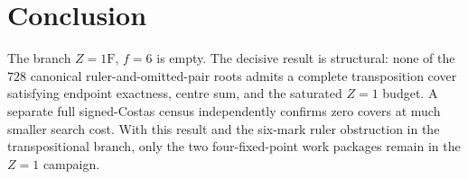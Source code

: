 \documentclass[11pt,a4paper]{article}
\begin{document}
\section{Conclusion}
The branch $Z=1\mathrm F$, $f=6$ is empty. The decisive result is structural: none of the $728$ canonical ruler-and-omitted-pair roots admits a complete transposition cover satisfying endpoint exactness, centre sum, and the saturated $Z=1$ budget. A separate full signed-Costas census independently confirms zero covers at much smaller search cost. With this result and the six-mark ruler obstruction in the transpositional branch, only the two four-fixed-point work packages remain in the $Z=1$ campaign.
\end{document}
